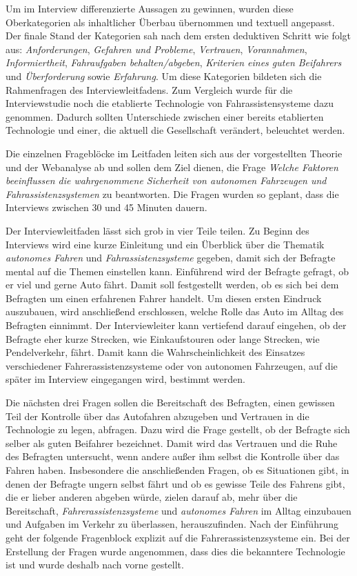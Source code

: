 \documentclass[12pt]{article}
\begin{document}
Um im Interview differenzierte Aussagen zu gewinnen, wurden diese Oberkategorien als inhaltlicher Überbau übernommen und textuell angepasst. Der finale Stand der Kategorien sah nach dem ersten deduktiven Schritt wie folgt aus: \emph{Anforderungen},  \emph{Gefahren und Probleme}, \emph{Vertrauen}, \emph{Vorannahmen}, \emph{Informiertheit}, \emph{Fahraufgaben behalten/abgeben}, \emph{Kriterien eines guten Beifahrers} und \emph{Überforderung} sowie \emph{Erfahrung}. Um diese Kategorien bildeten sich die Rahmenfragen des Interviewleitfadens. Zum Vergleich wurde für die Interviewstudie noch die etablierte Technologie von Fahrassistensysteme dazu genommen. Dadurch sollten Unterschiede zwischen einer bereits etablierten Technologie und einer, die aktuell die Gesellschaft verändert, beleuchtet werden.


Die einzelnen Frageblöcke im Leitfaden leiten sich aus der vorgestellten Theorie und der Webanalyse ab und sollen dem Ziel dienen, die Frage \emph{Welche Faktoren beeinflussen die wahrgenommene Sicherheit von autonomen Fahrzeugen und Fahrassistenzsystemen} zu beantworten. Die Fragen wurden so geplant, dass die Interviews zwischen 30 und 45 Minuten dauern.

Der Interviewleitfaden lässt sich grob in vier Teile teilen. Zu Beginn des Interviews wird eine kurze Einleitung und ein Überblick über die Thematik \emph{autonomes Fahren} und \emph{Fahrassistenzsysteme} gegeben, damit sich der Befragte mental auf die Themen einstellen kann.
Einführend wird der Befragte gefragt, ob er viel und gerne Auto fährt. Damit soll festgestellt werden, ob es sich bei dem Befragten um einen erfahrenen Fahrer handelt. Um diesen ersten Eindruck auszubauen, wird anschließend erschlossen, welche Rolle das Auto im Alltag des Befragten einnimmt. Der Interviewleiter kann vertiefend darauf eingehen, ob der Befragte eher kurze Strecken, wie Einkaufstouren oder lange Strecken, wie Pendelverkehr, fährt. Damit kann die Wahrscheinlichkeit des Einsatzes verschiedener Fahrerassistenzsysteme oder von autonomen Fahrzeugen, auf die später im Interview eingegangen wird, bestimmt werden.

Die nächsten drei Fragen sollen die Bereitschaft des Befragten, einen gewissen Teil der Kontrolle über das Autofahren abzugeben und Vertrauen in die Technologie zu legen, abfragen. Dazu wird die Frage gestellt, ob der Befragte sich selber als guten Beifahrer bezeichnet. Damit wird das Vertrauen und die Ruhe des Befragten untersucht, wenn andere außer ihm selbst die Kontrolle über das Fahren haben. Insbesondere die anschließenden Fragen, ob es Situationen gibt, in denen der Befragte ungern selbst fährt und ob es gewisse Teile des Fahrens gibt, die er lieber anderen abgeben würde, zielen darauf ab, mehr über die Bereitschaft, \emph{Fahrerassistenzsysteme}  und \emph{autonomes Fahren} im Alltag einzubauen und Aufgaben im Verkehr zu überlassen, herauszufinden.
Nach der Einführung geht der folgende Fragenblock explizit auf die Fahrerassistenzsysteme ein. Bei der Erstellung der Fragen wurde angenommen, dass dies die bekanntere Technologie ist und wurde deshalb nach vorne gestellt.
\end{document}
